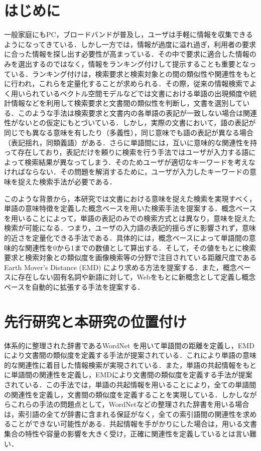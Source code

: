 \documentclass[japanese]{jnlp_1.4}
\begin{document}
\maketitle


\section{はじめに}
一般家庭にもPC，ブロードバンドが普及し，ユーザは手軽に情報を収集できるようになってきている．しかし一方では，情報が過度に溢れ過ぎ，利用者の要求に合った情報を探し出す必要性が高まっている．その中で要求に適合した情報のみを選出するのではなく，情報をランキング付けして提示することも重要となっている．ランキング付けは，検索要求と検索対象との間の類似性や関連性をもとに行われ，これらを定量化することが求められる．その際，従来の情報検索でよく用いられているベクトル空間モデル\cite{Salton:75}などでは文書における単語の出現頻度や統計情報などを利用して検索要求と文書間の類似性を判断し，文書を選別している．このような手法は検索要求と文書内の各単語の表記が一致しない場合は関連性がないとの仮定にもとづいている．しかし，実際の文書において，語の表記が同じでも異なる意味を有したり（多義性），同じ意味でも語の表記が異なる場合（表記揺れ，同類義語）がある．さらに単語間には，互いに意味的な関連性を持って存在しており，表記だけを頼りに検索を行う手法ではユーザが入力する語によって検索結果が異なってしまう．そのためユーザが適切なキーワードを考えなければならない．その問題を解消するために，ユーザが入力したキーワードの意味を捉えた検索手法が必要である．

このような背景から，本研究では文書における意味を捉えた検索を実現すべく，単語の意味特徴を定義した概念ベース\cite{okumura:07}を用いた検索手法を提案する．概念ベースを用いることによって，単語の表記のみでの検索方式とは異なり，意味を捉えた検索が可能になる．つまり，ユーザの入力語の表記的揺らぎに影響されず，意味的近さを定量化できる手法である．具体的には，概念ベースによって単語間の意味的な関連性を0から1までの数値として算出する．そして，その値をもとに検索要求と検索対象との類似度を画像検索等の分野で注目されている距離尺度であるEarth Mover's Distance (EMD) \cite{Rubner:00}により求める方法を提案する．また，概念ベースに存在しない固有名詞や新語に対して，Webをもとに新概念として定義し概念ベースを自動的に拡張する手法を提案する．


\section{先行研究と本研究の位置付け}

体系的に整理された辞書であるWordNet \cite{Miller:95}を用いて単語間の距離を定義し，EMDにより文書間の類似度を定義する手法\cite{Wan:06}が提案されている．これにより単語の意味的な関連性に着目した情報検索が実現されている．また，単語の共起情報をもとに単語間の関連性を定義し，EMDにより文書間の類似度を定義する手法が提案されている\cite{yanagimoto:07}．この手法では，単語の共起情報を用いることにより，全ての単語間の関連性を定義し，文書間の類似度を定義することを実現している．しかしながらこれらの手法の問題点として，WordNetなどの整理された辞書を用いる場合は，索引語の全てが辞書に含まれる保証がなく，全ての索引語間の関連性を求めることができない可能性がある．共起情報を手がかりにした場合は，用いる文書集合の特性や容量の影響を大きく受け，正確に関連性を定義しているとは言い難い．
\end{document}
